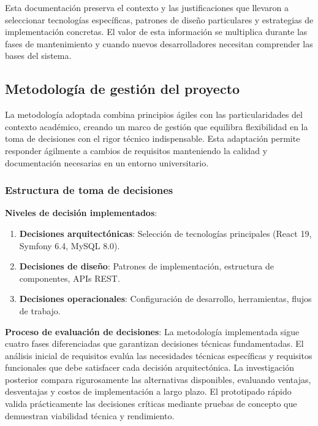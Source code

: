 \documentclass[12pt,a4paper,oneside]{report}
\providecommand{\tightlist}{%
  \setlength{\itemsep}{0pt}\setlength{\parskip}{0pt}}
\begin{document}
Esta documentación preserva el contexto y las justificaciones que llevaron a seleccionar tecnologías específicas, patrones de diseño particulares y estrategias de implementación concretas. El valor de esta información se multiplica durante las fases de mantenimiento y cuando nuevos desarrolladores necesitan comprender las bases del sistema.

\subsection{Metodología de gestión del
proyecto}\label{metodologuxeda-de-gestiuxf3n-del-proyecto}

La metodología adoptada combina principios ágiles con las particularidades del contexto académico, creando un marco de gestión que equilibra flexibilidad en la toma de decisiones con el rigor técnico indispensable. Esta adaptación permite responder ágilmente a cambios de requisitos manteniendo la calidad y documentación necesarias en un entorno universitario.

\subsubsection{Estructura de toma de
decisiones}\label{estructura-de-toma-de-decisiones}

\textbf{Niveles de decisión implementados}:

\begin{enumerate}
\def\labelenumi{\arabic{enumi}.}
\tightlist
\item
  \textbf{Decisiones arquitectónicas}: Selección de tecnologías
  principales (React 19, Symfony 6.4, MySQL 8.0).
\item
  \textbf{Decisiones de diseño}: Patrones de implementación, estructura
  de componentes, APIs REST.
\item
  \textbf{Decisiones operacionales}: Configuración de desarrollo,
  herramientas, flujos de trabajo.
\end{enumerate}

\textbf{Proceso de evaluación de decisiones}: La metodología implementada sigue cuatro fases diferenciadas que garantizan decisiones técnicas fundamentadas. El análisis inicial de requisitos evalúa las necesidades técnicas específicas y requisitos funcionales que debe satisfacer cada decisión arquitectónica. La investigación posterior compara rigurosamente las alternativas disponibles, evaluando ventajas, desventajas y costos de implementación a largo plazo. El prototipado rápido valida prácticamente las decisiones críticas mediante pruebas de concepto que demuestran viabilidad técnica y rendimiento.
\end{document}
